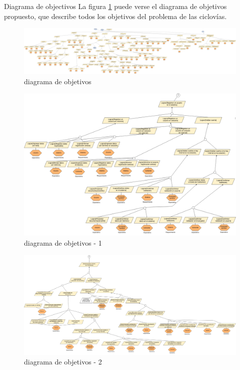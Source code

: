 \begin{subsection}{Diagrama de objectivos}
La figura \ref{fig:diagrama_objetivos} puede verse el diagrama de objetivos propuesto, que describe todos los objetivos del problema de las ciclovías.

\begin{figure}[H]
        \centering
        \includegraphics[angle=90,width=\textwidth,height=\textheight,keepaspectratio]{imagenes/diagrama_de_objetivos.png}
        \caption{diagrama de objetivos}
        \label{fig:diagrama_objetivos}
\end{figure}

\begin{figure}[H]
        \centering
        \includegraphics[angle=90,width=\textwidth,height=\textheight,keepaspectratio]{imagenes/do_1.png}
        \caption{diagrama de objetivos - 1}
        \label{fig:diagrama_objetivos_1}
\end{figure}

\begin{figure}[H]
        \centering
        \includegraphics[angle=90,width=\textwidth,height=\textheight,keepaspectratio]{imagenes/do_2.png}
        \caption{diagrama de objetivos - 2}
        \label{fig:diagrama_objetivos_2}
\end{figure}



\end{subsection}
